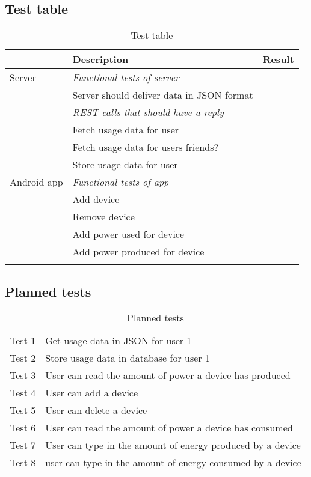 \subsection{Test table}
\begin{table}[H]
\begin{tabular}{|l|l|l|}
\hline
\rowcolor{darkgray} & \textbf{Description} & \textbf{Result}\\\hline \arrayrulecolor{lightgray}
\rowcolor{lightgray} Server& \textit{Functional tests of server}&\\
\cline{1-2}\cline{2-3}
\rowcolor{lightgray}&Server should deliver data in JSON format&\\
\cline{1-2}\cline{2-3}
\rowcolor{lightgray}&\textit{REST calls that should have a reply}&\\
\cline{1-2}\cline{2-3}
\rowcolor{lightgray}&Fetch usage data for user&\\
\cline{1-2}\cline{2-3}
\rowcolor{lightgray}&Fetch usage data for users friends?&\\
\cline{1-2}\cline{2-3}\arrayrulecolor{black}
\rowcolor{lightgray}&Store usage data for user&\\\hline
\arrayrulecolor{darkgray}
\rowcolor{darkgray}Android app & \textit{Functional tests of app} &  \\ \cline{1-2}\cline{2-3}
\rowcolor{darkgray}&Add device&\\ \cline{1-2}\cline{2-3}
\rowcolor{darkgray}&Remove device&\\ \cline{1-2}\cline{2-3}
\rowcolor{darkgray}&Add power used for device&\\ \cline{1-2}\cline{2-3}
\rowcolor{darkgray}&Add power produced for device&\\\arrayrulecolor{black}
\hline
\end{tabular}
\caption{Test table}
\label{tab:testTable}
\end{table}

\subsection{Planned tests}
\begin{table}[H]
\centering
{}
\begin{tabular}{|l|l|}
\hline
Test 1&Get usage data in JSON for user 1\\
Test 2&Store usage data in database for user 1\\
Test 3&User can read the amount of power a device has produced\\
Test 4&User can add a device\\
Test 5&User can delete a device\\
Test 6&User can read the amount of power a device has consumed\\
Test 7&User can type in the amount of energy produced by a device\\
Test 8&user can type in the amount of energy consumed by a device\\
\hline
\end{tabular}
\caption{Planned tests}
\label{tab:plannedTable}
\end{table}

